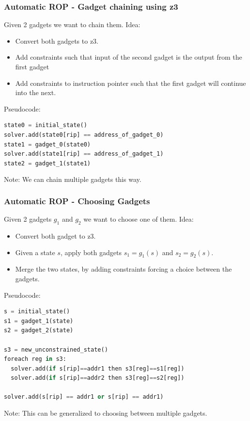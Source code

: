 \documentclass{beamer}
\begin{document}
\begin{frame}[fragile]
    \frametitle{Automatic ROP - Gadget chaining using z3}
    
    Given 2 gadgets we want to chain them. Idea:
    \begin{itemize}
        \item Convert both gadgets to z3.
        \item Add constraints such that input of the second gadget is the output from the first gadget
        \item Add constraints to instruction pointer such that the first gadget will continue into the next.
    \end{itemize}

    Pseudocode:
    \begin{lstlisting}[language=python]
state0 = initial_state()
solver.add(state0[rip] == address_of_gadget_0)
state1 = gadget_0(state0)
solver.add(state1[rip] == address_of_gadget_1)
state2 = gadget_1(state1)
    \end{lstlisting}
    Note: We can chain multiple gadgets this way.
\end{frame}

\begin{frame}[fragile]
    \frametitle{Automatic ROP - Choosing Gadgets}

    Given 2 gadgets $g_1$ and $g_2$ we want to choose one of them. Idea:
    \begin{itemize} 
        \item Convert both gadget to z3.
        \item Given a state $s$, apply both gadgets $s_1 = g_1(s)$ and $s_2 = g_2(s)$.
        \item Merge the two states, by adding constraints forcing a choice between the gadgets.
    \end{itemize}
    
    Pseudocode:
    \begin{lstlisting}[language=python]
s = initial_state()
s1 = gadget_1(state)
s2 = gadget_2(state)

s3 = new_unconstrained_state()
foreach reg in s3:
  solver.add(if s[rip]==addr1 then s3[reg]==s1[reg])
  solver.add(if s[rip]==addr2 then s3[reg]==s2[reg])

solver.add(s[rip] == addr1 or s[rip] == addr1)
    \end{lstlisting}
    Note: This can be generalized to choosing between multiple gadgets.
\end{frame}
\end{document}
